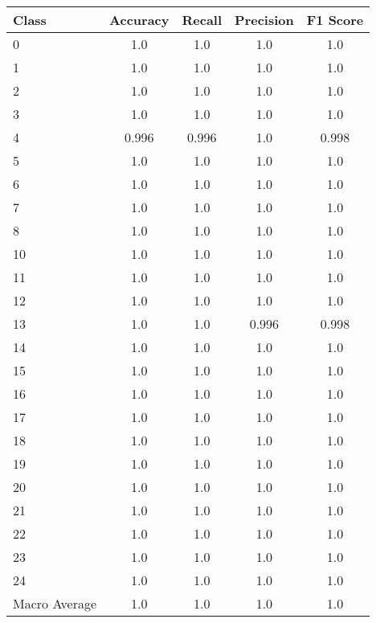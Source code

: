 \begin{tabular}{l c c c c}
Class & Accuracy & Recall & Precision & F1 Score\\ \hline
0 & 1.0 & 1.0 & 1.0 & 1.0\\
1 & 1.0 & 1.0 & 1.0 & 1.0\\
2 & 1.0 & 1.0 & 1.0 & 1.0\\
3 & 1.0 & 1.0 & 1.0 & 1.0\\
4 & 0.996 & 0.996 & 1.0 & 0.998\\
5 & 1.0 & 1.0 & 1.0 & 1.0\\
6 & 1.0 & 1.0 & 1.0 & 1.0\\
7 & 1.0 & 1.0 & 1.0 & 1.0\\
8 & 1.0 & 1.0 & 1.0 & 1.0\\
10 & 1.0 & 1.0 & 1.0 & 1.0\\
11 & 1.0 & 1.0 & 1.0 & 1.0\\
12 & 1.0 & 1.0 & 1.0 & 1.0\\
13 & 1.0 & 1.0 & 0.996 & 0.998\\
14 & 1.0 & 1.0 & 1.0 & 1.0\\
15 & 1.0 & 1.0 & 1.0 & 1.0\\
16 & 1.0 & 1.0 & 1.0 & 1.0\\
17 & 1.0 & 1.0 & 1.0 & 1.0\\
18 & 1.0 & 1.0 & 1.0 & 1.0\\
19 & 1.0 & 1.0 & 1.0 & 1.0\\
20 & 1.0 & 1.0 & 1.0 & 1.0\\
21 & 1.0 & 1.0 & 1.0 & 1.0\\
22 & 1.0 & 1.0 & 1.0 & 1.0\\
23 & 1.0 & 1.0 & 1.0 & 1.0\\
24 & 1.0 & 1.0 & 1.0 & 1.0\\
\hline
Macro Average & 1.0 & 1.0 & 1.0 & 1.0\\
\end{tabular}
